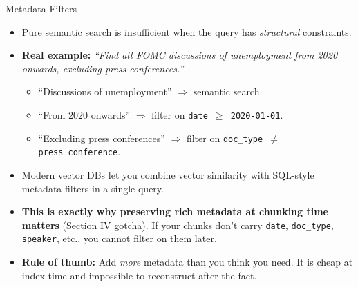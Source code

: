 \documentclass[10pt,english,aspectratio=169]{beamer}
\begin{document}
\begin{frame}{Metadata Filters}
\begin{itemize}
\item Pure semantic search is insufficient when the query has \emph{structural} constraints.

\medskip
\item \textbf{Real example:} \emph{``Find all FOMC discussions of unemployment from 2020 onwards, excluding press conferences.''}
\begin{itemize}
    \item ``Discussions of unemployment'' $\Rightarrow$ semantic search.
    \item ``From 2020 onwards'' $\Rightarrow$ filter on \texttt{date $\geq$ 2020-01-01}.
    \item ``Excluding press conferences'' $\Rightarrow$ filter on \texttt{doc\_type $\neq$ press\_conference}.
\end{itemize}

\medskip
\item Modern vector DBs let you combine vector similarity with SQL-style metadata filters in a single query.

\medskip
\item \textbf{This is exactly why preserving rich metadata at chunking time matters} (Section IV gotcha). If your chunks don't carry \texttt{date}, \texttt{doc\_type}, \texttt{speaker}, etc., you cannot filter on them later.

\medskip
\item \textbf{Rule of thumb:} Add \emph{more} metadata than you think you need. It is cheap at index time and impossible to reconstruct after the fact.
\end{itemize}
\end{frame}
\end{document}

